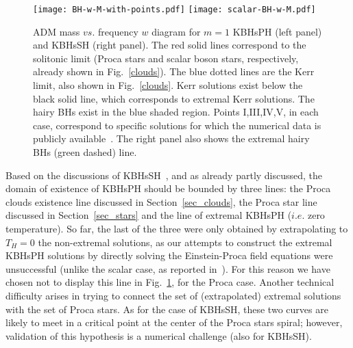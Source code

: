 %
\begin{figure}[h!]
  \begin{center}
    \texttt{[image: BH-w-M-with-points.pdf]}
      \texttt{[image: scalar-BH-w-M.pdf]}
  \end{center}
  \caption{ADM mass $vs.$ frequency $w$ diagram for $m=1$ KBHsPH (left panel) and KBHsSH (right panel). The red solid lines correspond to the solitonic limit (Proca stars and scalar boson stars, respectively, already shown in Fig.~\ref{clouds}). The blue dotted lines are the Kerr limit, also shown in Fig.~\ref{clouds}. Kerr solutions exist below the black solid line, which corresponds to extremal Kerr solutions. The hairy BHs exist in the blue shaded region. Points I,III,IV,V, in each case, correspond to specific solutions for which the numerical data is publicly available~\cite{datakbhph,datakbhsh}. The right panel also shows the extremal hairy BHs (green dashed) line.}
  \label{figdomain}
\end{figure}
%


Based on the discussions of KBHsSH~\cite{Herdeiro:2014goa,Herdeiro:2015gia,Herdeiro:2015tia}, and as already partly discussed, the domain of existence of KBHsPH should be bounded by three lines: the Proca clouds existence line discussed in Section~\ref{sec_clouds}, the Proca star line discussed in Section~\ref{sec_stars} and the line of extremal KBHsPH ($i.e.$ zero temperature). So far, the last of the three were only obtained by extrapolating to $T_H=0$ the non-extremal solutions, as our attempts to construct the extremal KBHsPH solutions by directly solving the Einstein-Proca field equations were unsuccessful (unlike the scalar case, as reported in~\cite{Herdeiro:2015gia}). For this reason we have chosen not to display this line in Fig.~\ref{figdomain}, for the Proca case.  Another technical difficulty arises in trying to connect the set of (extrapolated) extremal solutions with the set of Proca stars. As for the case of KBHsSH, these two curves are likely to meet in a critical point at the center of the 
Proca stars spiral; however, validation of this hypothesis is a numerical challenge (also for KBHsSH).

